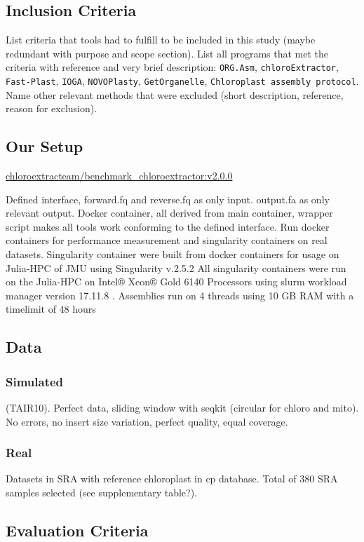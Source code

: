 \documentclass{bmcart}
\newcommand{\formatprogramnames}[1]{\texttt{#1}}
\newcommand{\ce}{\formatprogramnames{chloroExtractor}}
\newcommand{\oa}{\formatprogramnames{ORG.Asm}}
\newcommand{\fp}{\formatprogramnames{Fast-Plast}}
\newcommand{\ioga}{\formatprogramnames{IOGA}}
\newcommand{\np}{\formatprogramnames{NOVOPlasty}}
\newcommand{\go}{\formatprogramnames{GetOrganelle}}
\newcommand{\cassp}{\formatprogramnames{Chloroplast assembly protocol}}
\newcommand{\docker}[2]{\href{https://cloud.docker.com/u/chloroextractorteam/repository/docker/chloroextractorteam/#1}{chloroextracteam/#1:#2}}
\newcommand{\dockerce}{\docker{benchmark\_chloroextractor}{v2.0.0}}
\begin{document}
\subsection*{Inclusion Criteria}
List criteria that tools had to fulfill to be included in this study (maybe redundant with purpose and scope section).
List all programs that met the criteria with reference and very brief description:
\oa{}, \ce{}, \fp{}, \ioga{}, \np{}, \go{}, \cassp{}.
Name other relevant methods that were excluded (short description, reference, reason for exclusion).

\subsection*{Our Setup}
\dockerce{}

Defined interface, forward.fq and reverse.fq as only input. output.fa as only relevant output.
Docker container, all derived from main container, wrapper script makes all tools work conforming to the defined interface. Run docker containers for performance measurement and singularity containers on real datasets.
Singularity container were built from docker containers for usage on Julia-HPC of JMU using Singularity v.2.5.2 \cite{kurtzer2017singularity}
All singularity containers were run on the Julia-HPC on Intel® Xeon® Gold 6140 Processors using slurm workload manager version 17.11.8 \cite{Jette02slurm}. Assemblies run on 4 threads using 10 GB RAM with a timelimit of 48 hours 

\subsection*{Data}
\subsubsection*{Simulated}
 (TAIR10). Perfect data, sliding window with seqkit (circular for chloro and mito). No errors, no insert size variation, perfect quality, equal coverage.

\subsubsection*{Real}
Datasets in SRA with reference chloroplast in cp database.
Total of 380 SRA samples selected (see supplementary table?).

\subsection*{Evaluation Criteria}
\end{document}
